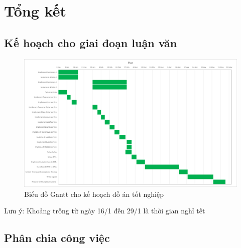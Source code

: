 \section{Tổng kết}
\subsection{Kế hoạch cho giai đoạn luận văn}

\begin{figure}
    \begin{center}
        \includegraphics[width=14cm]{img/plan.png}
    \end{center}
    \caption{Biểu đồ Gantt cho kế hoạch đồ án tốt nghiệp}
\end{figure}

Lưu ý: Khoảng trống từ ngày 16/1 đến 29/1 là thời gian nghỉ tết

\subsection{Phân chia công việc}
